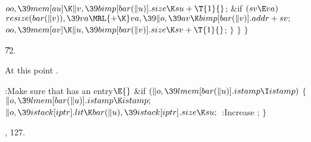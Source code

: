 ${}\\{oo},\39\\{mem}[\\{au}]\K\|v,\39\\{bimp}[\\{bar}(\|u)].\\{size}\K\\{su}+%
\T{1}{}$;\6
\&{if} ${}(\\{sv}\E\\{va}){}$\1\5
${}\\{resize}(\\{bar}(\|v)),\39\\{va}\MRL{+{\K}}\\{va},\39\|o,\39\\{av}\K%
\\{bimp}[\\{bar}(\|v)].\\{addr}+\\{sv};{}$\2\6
${}\\{oo},\39\\{mem}[\\{av}]\K\|u,\39\\{bimp}[\\{bar}(\|v)].\\{size}\K\\{sv}+%
\T{1}{}$;\6
\4${}\}{}$\2\6
\4${}\}{}$\2\6
\4${}\}{}$\2\par
\U72.\fi

At this point .

\Y\B\4:Make sure that  has an  entry\X${}%
\E{}$\6
\&{if} ${}(\|o,\39\\{lmem}[\\{bar}(\|u)].\\{istamp}\I\\{istamp}){}$\5
${}\{{}$\1\6
${}\|o,\39\\{lmem}[\\{bar}(\|u)].\\{istamp}\K\\{istamp};{}$\6
${}\|o,\39\\{istack}[\\{iptr}].\\{lit}\K\\{bar}(\|u),\39\\{istack}[\\{iptr}].%
\\{size}\K\\{su};{}$\6
:Increase \X;\6
\4${}\}{}$\2\par
{}, 127.\fi


